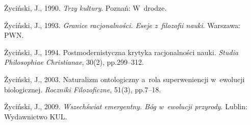 Życiński, J., 1990. \textit{Trzy kultury}. Poznań: W~drodze.



Życiński, J., 1993. \textit{Granice racjonalności. Eseje z~filozofii nauki}. Warszawa: PWN.



Życiński, J., 1994. Postmodernistyczna krytyka racjonalności nauki. \textit{Studia Philosophiae Christianae}, 30(2), pp.299–312.



Życiński, J., 2003. Naturalizm ontologiczny a~rola superweniencji w~ewolucji biologicznej. \textit{Roczniki Filozoficzne}, 51(3), pp.7–18.



Życiński, J., 2009. \textit{Wszechświat emergentny. Bóg w~ewolucji przyrody}. Lublin: Wydawnictwo KUL.



